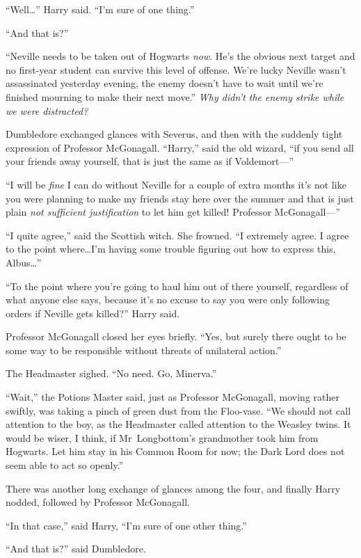 “Well…” Harry said. “I’m sure of one thing.”

“And that is?”

“Neville needs to be taken out of Hogwarts \emph{now}. He’s the obvious next target and no first-year student can survive this level of offense. We’re lucky Neville wasn’t assassinated yesterday evening, the enemy doesn’t have to wait until we’re finished mourning to make their next move.” \emph{Why didn’t the enemy strike while we were distracted?}

Dumbledore exchanged glances with Severus, and then with the suddenly tight expression of Professor McGonagall. “Harry,” said the old wizard, “if you send all your friends away yourself, that is just the same as if Voldemort—”

“I will be \emph{fine} I can do without Neville for a couple of extra months it’s not like you were planning to make my friends stay here over the summer and that is just plain \emph{not sufficient justification} to let him get killed! Professor McGonagall—”

“I quite agree,” said the Scottish witch. She frowned. “I extremely agree. I agree to the point where…I’m having some trouble figuring out how to express this, Albus…”

“To the point where you’re going to haul him out of there yourself, regardless of what anyone else says, because it’s no excuse to say you were only following orders if Neville gets killed?” Harry said.

Professor McGonagall closed her eyes briefly. “Yes, but surely there ought to be some way to be responsible without threats of unilateral action.”

The Headmaster sighed. “No need. Go, Minerva.”

“Wait,” the Potions Master said, just as Professor McGonagall, moving rather swiftly, was taking a pinch of green dust from the Floo-vase. “We should not call attention to the boy, as the Headmaster called attention to the Weasley twins. It would be wiser, I think, if Mr~Longbottom’s grandmother took him from Hogwarts. Let him stay in his Common Room for now; the Dark Lord does not seem able to act so openly.”

There was another long exchange of glances among the four, and finally Harry nodded, followed by Professor McGonagall.

“In that case,” said Harry, “I’m sure of one other thing.”

“And that is?” said Dumbledore.

